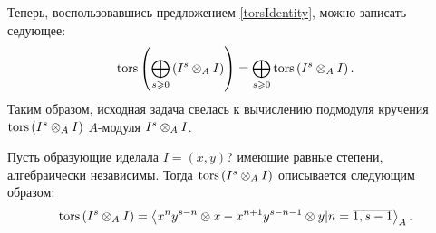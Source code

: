     Теперь, воспользовавшись предложением \ref{torsIdentity}, можно записать седующее:
    \begin{equation*}
        \textup{tors}\left(\bigoplus_{s \geqslant 0} \left( I^s \otimes_A I \right)\right) = 
        \bigoplus_{s \geqslant 0}\textup{tors}\left( I^s \otimes_A I \right).
    \end{equation*}
    Таким образом, исходная задача свелась к вычислению подмодуля кручения \linebreak$\textup{tors}\left( I^s \otimes_A I \right)$ 
    $A$-модуля $I^s \otimes_A I$.
    \begin{Theorem} \label{tors_simple}
        Пусть образующие иделала $I = (x, y)$? имеющие равные степени, алгебраически независимы. 
        Тогда $\textup{tors}\left(I^s \otimes_A I\right)$ описывается следующим образом:
        \begin{equation*}
            \textup{tors}\left(I^s \otimes_A I\right) = \left< x^ny^{s - n} \otimes x - x^{n + 1}y^{s - n - 1} \otimes y |
             n = \overline{1, s-1}\right>_A.
        \end{equation*}
    \end{Theorem}
